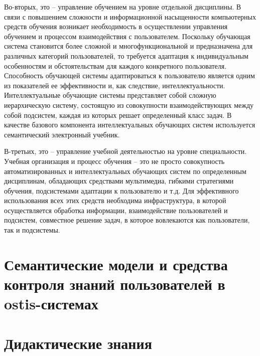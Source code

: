 Во-вторых, это -- управление обучением на уровне отдельной дисциплины. В связи с повышением сложности и информационной насыщенности компьютерных средств обучения возникает необходимость в осуществлении управления обучением и процессом взаимодействия с пользователем. Поскольку обучающая система становится более сложной и многофункциональной и предназначена для различных категорий пользователей, то требуется адаптация к индивидуальным особенностям и обстоятельствам для каждого конкретного пользователя. Способность обучающей системы адаптироваться к пользователю является одним из показателей ее эффективности и, как следствие, интеллектуальности. Интеллектуальные обучающие системы представляет собой сложную иерархическую систему, состоящую из совокупности взаимодействующих между собой подсистем, каждая из которых решает определенный класс задач. В качестве базового компонента интеллектуальных обучающих систем используется семантический электронный учебник.

В-третьих, это -- управление учебной деятельностью на уровне специальности. Учебная организация и процесс обучения -- это не просто совокупность автоматизированных и интеллектуальных обучающих систем по определенным дисциплинам, обладающих средствами мультимедиа, гибкими стратегиями обучения, подсистемами адаптации к пользователю и т.д. Для эффективного использования всех этих средств необходима инфраструктура, в которой осуществляется обработка информации, взаимодействие пользователей и подсистем, совместное решение задач, в которое вовлекаются как пользователи, так и подсистемы.

\section{Семантические модели и средства контроля знаний пользователей в ostis-системах}
\section{Дидактические знания}
\label{section_knowledge_control}

%